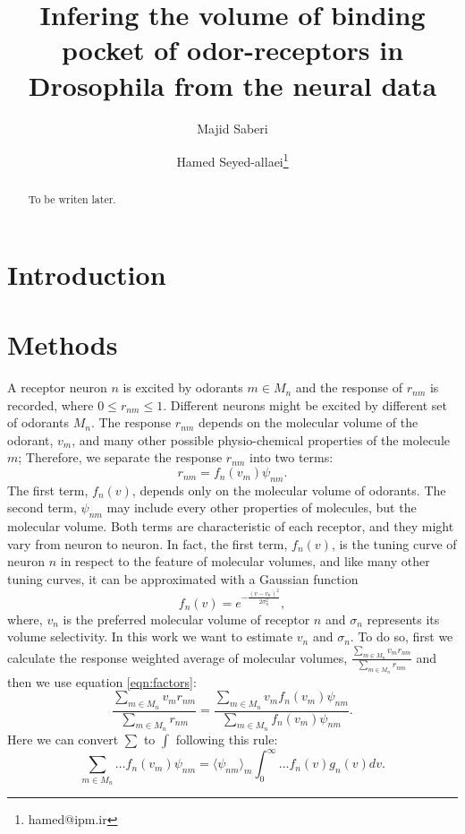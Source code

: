 \documentclass[11pt]{paper} %
\title{Infering the volume of binding pocket of odor-receptors in Drosophila from the neural data}
\author{Majid Saberi \and Hamed Seyed-allaei\thanks{hamed@ipm.ir}}
\begin{document}
\maketitle
\begin{abstract}
To be writen later.
\end{abstract}

\section{Introduction}

\section{Methods}
A receptor neuron $n$ is excited by odorants $m \in M_n$ and the response of $r_{nm}$ is recorded, where $0 \le r_{nm} \le 1$. 
Different neurons might be excited by different set of odorants $M_n$. 
The response $r_{nm}$ depends on the molecular volume of the odorant, $v_m$, 
and many other possible physio-chemical properties of the molecule $m$; 
Therefore, we separate the response $r_{nm}$ into two terms:
\begin{equation}
r_{nm} = f_n(v_m) \psi_{nm}.
\label{eqn:factors}
\end{equation}
The first term, $f_n(v)$, depends only on the molecular volume of odorants.
The second term, $\psi_{nm}$ may include every other properties of molecules, but the molecular volume.
Both terms are characteristic of each receptor, and they might vary from neuron to neuron.
In fact, the first term, $f_n(v)$, is the tuning curve of neuron $n$ in respect to the feature of molecular volumes, 
and like many other tuning curves, it can be approximated with a Gaussian function
\[
\displaystyle f_n(v) = e^{-\frac{(v-v_n)^2}{2\sigma^2_n}}, 
\]
where, $v_n$ is the preferred molecular volume of receptor $n$ and $\sigma_n$ represents its volume selectivity. 
In this work we want to estimate $v_n$ and $\sigma_n$. 
To do so, first we calculate the response weighted average of molecular volumes, 
$\frac{\sum_{m\in M_n} v_m r_{nm}}{\sum_{m\in M_n} r_{nm}}$ and then we use equation \ref{eqn:factors}:
\begin{equation}
\frac{\displaystyle \sum_{m\in M_n} v_m r_{nm}}{\displaystyle \sum_{m\in M_n} r_{nm}} = \frac{\displaystyle \sum_{m\in M_n} v_m f_n(v_m) \psi_{nm}}{\displaystyle \sum_{m\in M_n} f_n(v_m) \psi_{nm}}.
\label{eqn:sta}
\end{equation}
Here we can convert $\sum$ to $\int$ following this rule:
\begin{equation}
\sum_{m\in M_n} \dots f_n(v_m) \psi_{nm} =  \langle \psi_{nm} \rangle_m \int_0^\infty \dots f_n(v) g_n(v)  dv. 
\label{eqn:sigma_to_int}
\end{equation}
\end{document}
